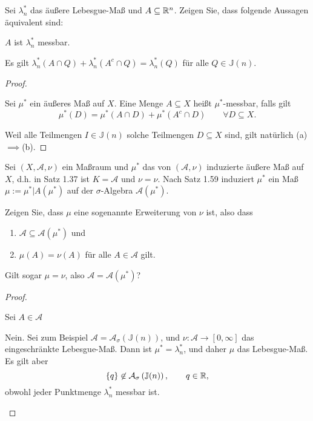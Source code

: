 \begin{Problem}
	Sei $\lambda^*_n$ das äußere Lebesgue-Maß und $A \subseteq \mathbb{R}^n$. Zeigen Sie, dass folgende Aussagen äquivalent sind:
	\begin{parts}
		\item $A$ ist $\lambda_n^*$ messbar.
		\item Es gilt $\lambda_n^*\left( A\cap Q \right) +\lambda_n^*\left( A^c\cap Q \right) =\lambda_n^*(Q)$ f\"{u}r alle $Q\in \mathbb{J}(n)$.
	\end{parts}
\end{Problem}
\begin{proof}
	\begin{Definition}
	Sei $\mu^*$ ein äußeres Maß auf $X$. Eine Menge $A\subseteq X$ heißt $\mu^*$-messbar, falls gilt
	\[
		\mu^*(D)=\mu^*(A\cap D)+\mu^*(A^c\cap D)\qquad \forall D\subseteq X
	.\] 
	\end{Definition}
Weil alle Teilmengen $I\in \mathbb{J}(n)$ solche Teilmengen $D\subseteq X$ sind, gilt natürlich (a)$\implies$(b).
\end{proof}

\begin{Problem}
	 Sei $(X, \mathcal{A}, \nu)$ ein Maßraum und $\mu^*$ das von $(\mathcal{A}, \nu)$ induzierte äußere Maß auf $X$, d.h. in Satz 1.37 ist $K = \mathcal{A}$ und $\nu=\nu$. Nach Satz 1.59 induziert $\mu^*$ ein Maß $\mu := \mu^* |A(\mu^*)$ auf der $\sigma$-Algebra $\mathcal{A}(\mu^*)$.
	 \begin{parts}
	 \item Zeigen Sie, dass $\mu$ eine sogenannte Erweiterung von $\nu$ ist, also dass
		 \begin{enumerate}[label=(\arabic*)]
			 \item $\mathcal{A}\subseteq \mathcal{A}(\mu^*)$ und
			 \item $\mu(A)=\nu(A)$ f\"{u}r alle $A\in \mathcal{A}$ gilt.
		 \end{enumerate}
	 \item Gilt sogar $\mu=\nu$, also $\mathcal{A}=\mathcal{A}(\mu^*)$?
	 \end{parts}
\end{Problem}
\begin{proof}
	\begin{parts}
	\item Sei $A\in \mathcal{A}$ 
	\item Nein. Sei zum Beispiel $\mathcal{A}=\mathcal{A}_\sigma\left(\mathbb{J}(n)\right)$, und $\nu:\mathcal{A}\to [0,\infty]$ das eingeschränkte Lebesgue-Maß. Dann ist $\mu^*=\lambda_n^*$, und daher $\mu$ das Lebesgue-Maß. Es gilt aber
		\[
			\left\{ q \right\} \not\in \mathcal{A}_\sigma\left( \mathbb{J}(n) \right), \qquad q\in \mathbb{R}
		,\] 
		obwohl jeder Punktmenge $\lambda_n^*$ messbar ist.
	\end{parts}
\end{proof}
